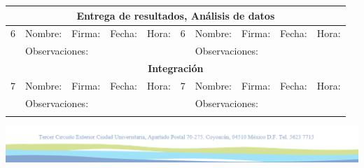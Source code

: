\documentclass{article}
\begin{document}
\begin{center}
\begin{tabular}{|p{0.1cm}|p{2.7cm}|p{1.4cm}|p{1.4cm}|p{1cm}|p{0.1cm}|p{2.7cm}|p{1.4cm}|p{1.4cm}|p{1cm}|}
	    \hline 
	    \multicolumn{10}{|c|}{\cellcolor{gainsboro}\textbf{Entrega de resultados, Análisis de datos} } \\
	    \hline 
	    6 & Nombre: & Firma: & Fecha: & Hora: & 6 & Nombre: & Firma: & Fecha: & Hora: \\[2.6ex] 
	    \hline 
	    & \multicolumn{4}{l|}{Observaciones:} &  & \multicolumn{4}{l|}{Observaciones:}  \\[2.6ex] 
	    \hline 
	    \multicolumn{10}{|c|}{\cellcolor{gainsboro}\textbf{Integración} } \\
	    \hline 
	    7 & Nombre: & Firma: & Fecha: & Hora: & 7 & Nombre: & Firma: & Fecha: & Hora: \\[2.6ex] 
	    \hline 
	    & \multicolumn{4}{l|}{Observaciones:} &  & \multicolumn{4}{l|}{Observaciones:}  \\[2.6ex] 
	    \hline 
	    & \multicolumn{4}{c|}{} &  & \multicolumn{4}{c|}{}  \\[5ex] 
	    \hline
	    
	    \end{tabular}     
    
    \includegraphics[scale=0.78]{abajo1.png}
    
    \end{center}
\end{document}
